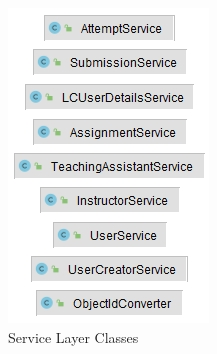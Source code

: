 \documentclass[a4paper, 12pt]{article}
\begin{document}
\begin{figure}[H]
{        \includegraphics[width=\linewidth]{small-groups/service-layer.jpg}
        \caption{Service Layer Classes}
        \endminipage}\hfill
        \end{figure}
\end{document}
